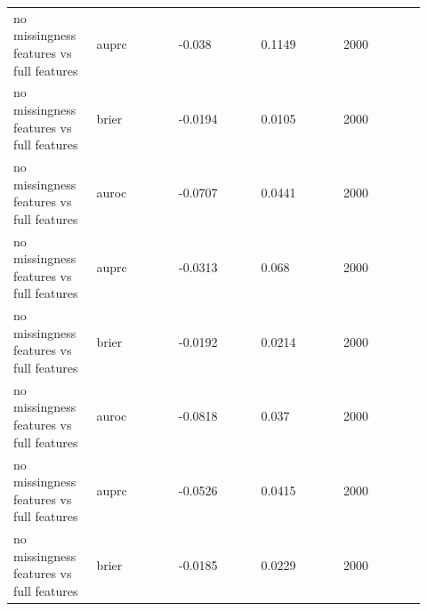 \documentclass[utf8]{frontiers_suppmat}
\begin{document}
\begin{landscape}
\begin{longtable}{L{0.184\linewidth} L{0.184\linewidth} L{0.184\linewidth} L{0.184\linewidth} L{0.184\linewidth}}
no missingness features vs full features & auprc & -\allowbreak{}0.\allowbreak{}038 & 0.\allowbreak{}1149 & 2000 \\
no missingness features vs full features & brier & -\allowbreak{}0.\allowbreak{}0194 & 0.\allowbreak{}0105 & 2000 \\
no missingness features vs full features & auroc & -\allowbreak{}0.\allowbreak{}0707 & 0.\allowbreak{}0441 & 2000 \\
no missingness features vs full features & auprc & -\allowbreak{}0.\allowbreak{}0313 & 0.\allowbreak{}068 & 2000 \\
no missingness features vs full features & brier & -\allowbreak{}0.\allowbreak{}0192 & 0.\allowbreak{}0214 & 2000 \\
no missingness features vs full features & auroc & -\allowbreak{}0.\allowbreak{}0818 & 0.\allowbreak{}037 & 2000 \\
no missingness features vs full features & auprc & -\allowbreak{}0.\allowbreak{}0526 & 0.\allowbreak{}0415 & 2000 \\
no missingness features vs full features & brier & -\allowbreak{}0.\allowbreak{}0185 & 0.\allowbreak{}0229 & 2000 \\
\end{longtable}
\normalsize
\end{landscape}
\end{document}

